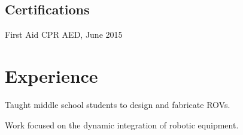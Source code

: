 \documentclass[letterpaper]{deedy-resume} %
\begin{document}
\begin{minipage}[t]{0.39\textwidth}
\sectionspace %

\subsection{Certifications}
First Aid CPR AED, June 2015



\end{minipage} %
\hfill
%
%
\begin{minipage}[t]{0.58\textwidth} %


\section{Experience}


\vspace{\topsep} %
\begin{tightitemize}
\item Taught middle school students to design and fabricate ROVs.
\end{tightitemize}

\sectionspace %



\begin{tightitemize}
\item Work focused on the dynamic integration of robotic equipment.
\end{tightitemize}

\sectionspace %



\end{minipage}
\end{document}

